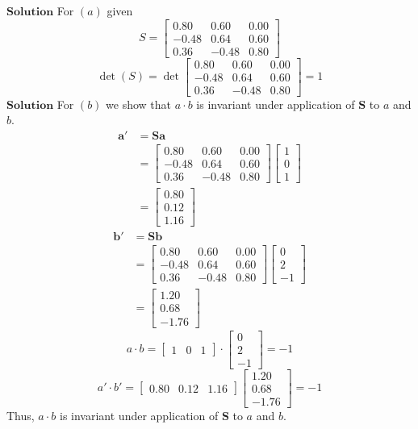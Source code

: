 $\boxed{\textbf{Solution}}$ For $(a)$ given 
$$
S=\begin{bmatrix}
0.80 & 0.60 & 0.00 \\
-0.48 & 0.64 & 0.60 \\
0.36 & -0.48 & 0.80
\end{bmatrix}
$$
$$
\operatorname{det}(S)=\operatorname{det}\begin{bmatrix}
0.80 & 0.60 & 0.00 \\
-0.48 & 0.64 & 0.60 \\
0.36 & -0.48 & 0.80
\end{bmatrix}=1
$$
$\boxed{\textbf{Solution}}$ For $(b)$ we show that $a \cdot b$ is invariant under application of $\mathbf{S}$ to $a$ and $b$.
$$
\begin{aligned}
\mathbf{a}' &=\mathbf{S} \mathbf{a} \\
&=\begin{bmatrix}
0.80 & 0.60 & 0.00 \\
-0.48 & 0.64 & 0.60 \\
0.36 & -0.48 & 0.80
\end{bmatrix}\begin{bmatrix}
1 \\
0 \\
1
\end{bmatrix} \\
&=\begin{bmatrix}
0.80 \\
0.12 \\
1.16
\end{bmatrix}
\end{aligned}
$$
$$
\begin{aligned}
\mathbf{b}' &=\mathbf{S} \mathbf{b} \\
&=\begin{bmatrix}
0.80 & 0.60 & 0.00 \\
-0.48 & 0.64 & 0.60 \\
0.36 & -0.48 & 0.80
\end{bmatrix}\begin{bmatrix}
0 \\
2 \\
-1
\end{bmatrix} \\
&=\begin{bmatrix}
1.20 \\
0.68 \\
-1.76
\end{bmatrix}
\end{aligned}
$$
$$
a \cdot b=\begin{bmatrix}
1 & 0 & 1
\end{bmatrix} \cdot\begin{bmatrix}
0 \\
2 \\
-1
\end{bmatrix}=-1
$$
$$
a' \cdot b'=\begin{bmatrix}
0.80 & 0.12 & 1.16
\end{bmatrix}\begin{bmatrix}
1.20 \\
0.68 \\
-1.76
\end{bmatrix}=-1
$$
Thus, $a \cdot b$ is invariant under application of $\mathbf{S}$ to $a$ and $b$.

